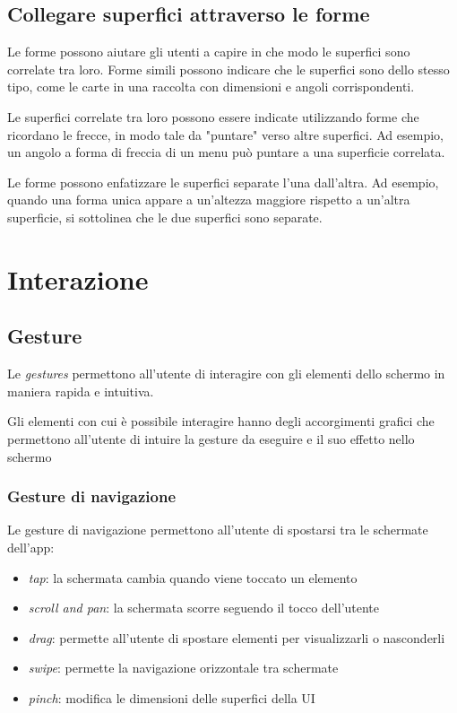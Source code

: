 \documentclass[12pt, a4paper]{report}
\begin{document}
	\subsection{Collegare superfici attraverso le forme}
	Le forme possono aiutare gli utenti a capire in che modo le superfici sono correlate tra loro.
	Forme simili possono indicare che le superfici sono dello stesso tipo, come le carte in una raccolta con dimensioni e angoli corrispondenti.

	Le superfici correlate tra loro possono essere indicate utilizzando forme che ricordano le frecce, in modo tale da "puntare" verso altre superfici. Ad esempio, un angolo a forma di freccia di un menu può puntare a una superficie correlata.


	Le forme possono enfatizzare le superfici separate l'una dall'altra. Ad esempio, quando una forma unica appare a un'altezza maggiore rispetto a un'altra superficie, si sottolinea che le due superfici sono separate.


	\section{Interazione}

		\subsection{Gesture}	
		Le \textit{gestures} permettono all'utente di interagire con gli elementi dello schermo in maniera rapida e intuitiva.
		
		Gli elementi con cui è possibile interagire hanno degli accorgimenti grafici che permettono all'utente di intuire la gesture da eseguire e il suo effetto nello schermo
		
			\subsubsection{Gesture di navigazione}
			Le gesture di navigazione permettono all'utente di spostarsi tra le schermate dell'app:
			\begin{itemize}
				\item \textit{tap}: la schermata cambia quando viene toccato un elemento
				\item \textit{scroll and pan}: la schermata scorre seguendo il tocco dell'utente
				\item \textit{drag}: permette all'utente di spostare elementi per visualizzarli o nasconderli
				\item \textit{swipe}: permette la navigazione orizzontale tra schermate
				\item \textit{pinch}: modifica le dimensioni delle superfici della UI
			\end{itemize}
			
\end{document}
